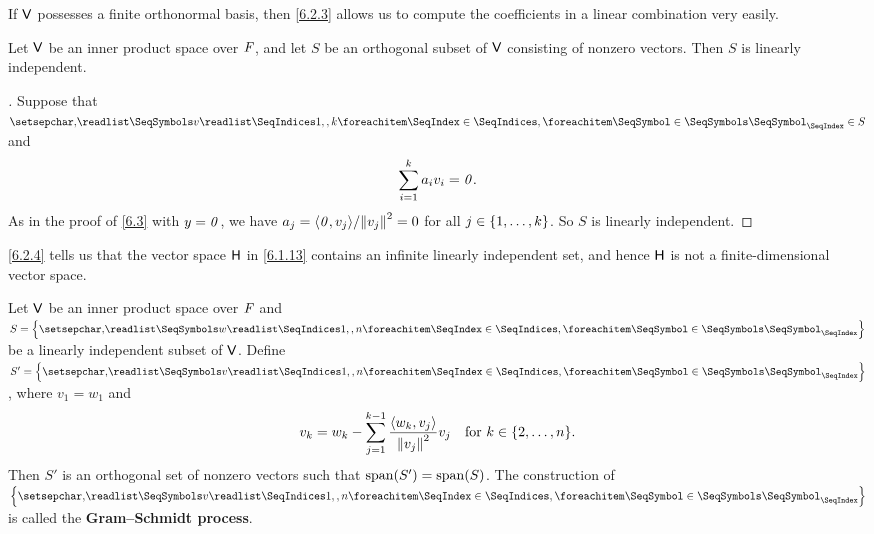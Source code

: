 \begin{note}
	If \(\mathsf{V}\) possesses a finite orthonormal basis, then \cref{6.2.3} allows us to compute the coefficients in a linear combination very easily.
\end{note}

\begin{cor}\label{6.2.4}
	Let \(\mathsf{V}\) be an inner product space over \(\mathit{F}\), and let \(S\) be an orthogonal subset of \(\mathsf{V}\) consisting of nonzero vectors.
	Then \(S\) is linearly independent.
\end{cor}

\begin{proof}[]
	Suppose that \(\seq{v}{1,,k} \in S\) and
	\[
		\sum_{i = 1}^k a_i v_i = \mathit{0}.
	\]
	As in the proof of \cref{6.3} with \(y = \mathit{0}\), we have \(a_j = \inn{\zv, v_j} / \norm{v_j}^2 = 0\) for all \(j \in \left\lbrace1, \dots, k\right\rbrace\).
	So \(S\) is linearly independent.
\end{proof}

\begin{note}
	\cref{6.2.4} tells us that the vector space \(\mathsf{H}\) in \cref{6.1.13} contains an infinite linearly independent set, and hence \(\mathsf{H}\) is not a finite-dimensional vector space.
\end{note}

\begin{thm}\label{6.4}
	Let \(\mathsf{V}\) be an inner product space over \(\mathit{F}\) and \(S = \set{\seq{w}{1,,n}}\) be a linearly independent subset of \(\mathsf{V}\).
	Define \(S' = \set{\seq{v}{1,,n}}\), where \(v_1 = w_1\) and
	\begin{equation}\label{eq:6.2.1}
		v_k = w_k - \sum_{j = 1}^{k - 1} \frac{\inn{w_k, v_j}}{\norm{v_j}^2} v_j \quad \text{for } k \in \set{2, \dots, n}.
	\end{equation}
	Then \(S'\) is an orthogonal set of nonzero vectors such that \(\spn{S'} = \spn{S}\).
	The construction of \(\set{\seq{v}{1,,n}}\) is called the \textbf{Gram--Schmidt process}.
\end{thm}

